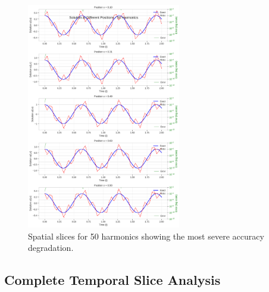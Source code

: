 \begin{figure}[H]
    \centering
    \includegraphics[width=0.6\textwidth]{figures/space_slices_50h.png}
    \caption{Spatial slices for 50 harmonics showing the most severe accuracy degradation.}
    \label{fig:space_slices_50h}
\end{figure}

\subsection{Complete Temporal Slice Analysis}

